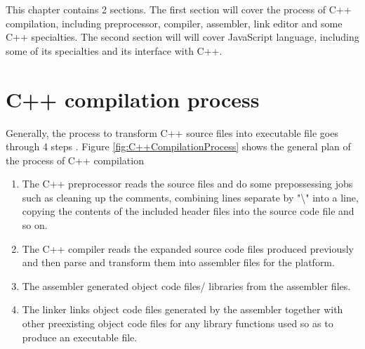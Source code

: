  \label{chap:Conceptions}
This chapter contains 2 sections. The first section will cover the process of C++ compilation, including preprocessor, compiler, assembler, link editor and some C++ specialties. The second section will will cover JavaScript language, including some of its specialties and its interface with C++. 

\section{C++ compilation process}
    Generally, the process to transform C++ source files into executable file goes through 4 steps \footnotemark. Figure \ref{fig:C++CompilationProcess} shows the general plan of the process of C++ compilation
    
    \begin{enumerate}
        \item The C++ preprocessor reads the source files and  do some prepossessing jobs such as cleaning up the comments, combining lines separate by "\textbackslash"
        into a line, copying the contents of the included header files into the source code file and so on.

        \item The C++ compiler reads the expanded source code files produced previously and then parse and transform them into assembler files for the platform.

        \item The assembler generated object code files/ libraries from the assembler files.

        \item The linker links object code files generated by the assembler together with other preexisting object code files for any library functions used so as to produce an executable file.
    \end{enumerate}
    
